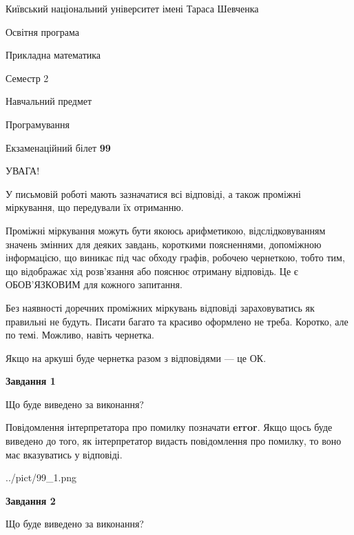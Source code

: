 \documentclass[12pt, ukrainian]{article}
\begin{document}
{{\begin {small}\par
{ \center  Київський національний університет імені Тараса Шевченка \par}
{\parbox {5 cm}{Освітня програма \hfill}{\parbox {7 cm}{Прикладна математика \hfill}}\parbox {6 cm}{\hfill Семестр 2}}\par
{\parbox {5 cm} {Навчальний предмет \hfill}\parbox {7 cm}{Програмування \hfill}\parbox {6cm}{\hfill}\par}\vspace{-7pt} \end{small}}{\center Екзаменаційний білет \No \textbf
{ 99 }\par}}
{
\begin {large}
УВАГА!

У письмовій роботі мають зазначатися всі відповіді, а також проміжні міркування, що передували їх отриманню.

Проміжні міркування можуть бути якоюсь арифметикою, відслідковуванням зна\-чень змінних для деяких завдань,
короткими поясненнями, допоміжною інформацією, що виникає під час обходу графів, робочею чернеткою,
тобто тим, що відображає хід розв’язання або пояснює отриману відповідь.
Це є ОБОВ’ЯЗКОВИМ для кожного запитання.

Без наявності доречних проміжних міркувань відповіді зараховуватись як правиль\-ні не будуть.
Писати багато та красиво оформлено не треба. Коротко, але по темі. Можли\-во, навіть чернетка.

Якщо на аркуші буде чернетка разом з відповідями --- це ОК.

\newpage

{\begin {center}\textbf{Завдання 1}\end {center}}\par
Що буде виведено за виконання?

Повідомлення інтерпретатора про помилку позначати \textbf{error}.
Якщо щось буде виведено до того, як інтерпретатор видасть повідомлення про помилку, 
то воно має вказуватись у відповіді. \par


\begin{center}
	{../pict/99_1.png}
\end{center}
\newpage

{\begin {center}\textbf{Завдання 2}\end {center}}\par
Що буде виведено за виконання?


\end{large}}
\end{document}
